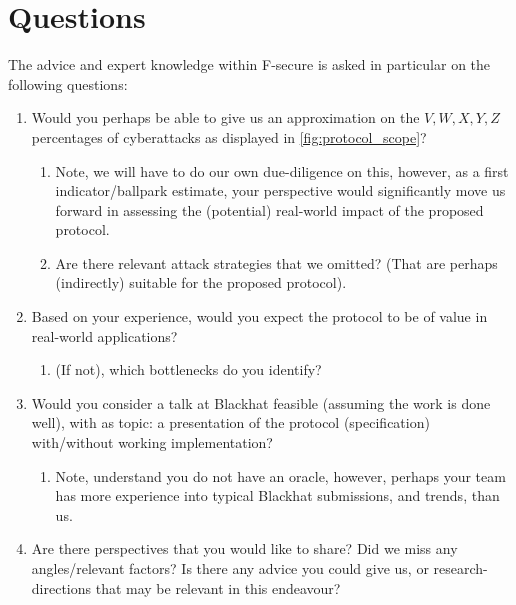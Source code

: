 \section{Questions}
\label{sec:questions}
The advice and expert knowledge within F-secure is asked in particular on the following questions:
\begin{enumerate}
    \item Would you perhaps be able to give us an approximation on the $V,W,X,Y,Z$ percentages of cyberattacks as displayed in \cref{fig:protocol_scope}? 
    \begin{enumerate}
        \item Note, we will have to do our own due-diligence on this, however, as a first indicator/ballpark estimate, your perspective would significantly move us forward in assessing the (potential) real-world impact of the proposed protocol. 
        \item Are there relevant attack strategies that we omitted? (That are perhaps (indirectly) suitable for the proposed protocol).
    \end{enumerate}
    \item Based on your experience, would you expect the protocol to be of value in real-world applications?
    \begin{enumerate}
        \item (If not), which bottlenecks do you identify?
    \end{enumerate}
    \item Would you consider a talk at Blackhat feasible (assuming the work is done well), with as topic: a presentation of the protocol (specification) with/without working implementation?
    \begin{enumerate}
        \item Note, understand you do not have an oracle, however, perhaps your team has more experience into typical Blackhat submissions, and trends, than us.
    \end{enumerate}
    \item Are there perspectives that you would like to share? Did we miss any angles/relevant factors? Is there any advice you could give us, or research-directions that may be relevant in this endeavour?
\end{enumerate}
